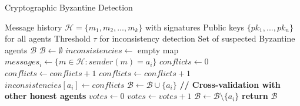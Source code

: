 \begin{algorithm}[htbp]
\caption{Cryptographic Byzantine Detection}
\label{alg:byzantine_detection}
\begin{algorithmic}[1]
\REQUIRE Message history $\mathcal{H} = \{m_1, m_2, ..., m_k\}$ with signatures
\REQUIRE Public keys $\{pk_1, ..., pk_n\}$ for all agents
\REQUIRE Threshold $\tau$ for inconsistency detection
\ENSURE Set of suspected Byzantine agents $\mathcal{B}$
\STATE $\mathcal{B} \gets \emptyset$
\STATE $inconsistencies \gets$ empty map
    \STATE $messages_i \gets \{m \in \mathcal{H} : sender(m) = a_i\}$
    \STATE $conflicts \gets 0$
                \STATE $conflicts \gets conflicts + 1$
            \ENDIF
        \ELSE
            \STATE $conflicts \gets conflicts + 1$ 
        \ENDIF
    \ENDFOR
    \STATE $inconsistencies[a_i] \gets conflicts$
        \STATE $\mathcal{B} \gets \mathcal{B} \cup \{a_i\}$
    \ENDIF
\ENDFOR
\STATE \textbf{// Cross-validation with other honest agents}
    \STATE $votes \gets 0$
            \STATE $votes \gets votes + 1$
        \ENDIF
    \ENDFOR
        \STATE $\mathcal{B} \gets \mathcal{B} \setminus \{a_i\}$ 
    \ENDIF
\ENDFOR
\STATE \textbf{return} $\mathcal{B}$
\end{algorithmic}
\end{algorithm}

